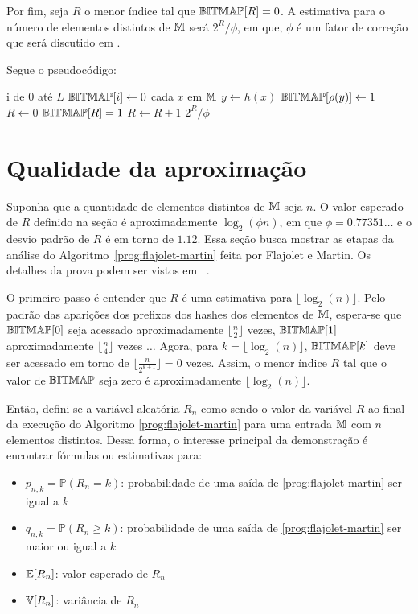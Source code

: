 Por fim, seja $R$ o menor índice tal que $\mathbb{BITMAP}[R] = 0$. A estimativa para o número de elementos distintos de 
$\mathbb{M}$ será $2^R/\phi$, em que, $\phi$ é um fator de correção que será discutido em 
.

Segue o pseudocódigo:
\begin{codebox}
  \li \For i de $0$ até $L$
      \Do
  \li    $\mathbb{BITMAP}[i] \gets 0$
      \End
  \li \For cada $x$ em $\mathbb{M}$
      \Do
  \li   $y \gets h(x)$
  \li   $\mathbb{BITMAP}[\rho(y)] \gets 1$
      \End
  \li $R \gets 0$
  \li \While $\mathbb{BITMAP}[R] = 1$
      \Do
  \li   $R \gets R + 1$
      \End
  \li
  \Return $2^R/\phi$
  \End
\end{codebox}

\newpage
\section{Qualidade da aproximação}
\label{sec:flajolet-martin:analysis}

Suponha que a quantidade de elementos distintos de $\mathbb{M}$ seja $n$. O valor esperado de $R$ definido na seção 
 é aproximadamente $\log_2(\phi n)$, em que $\phi = 0.77351\dots$ e o desvio padrão 
de $R$ é em torno de $1.12$. Essa seção busca mostrar as etapas da análise do Algoritmo~\ref{prog:flajolet-martin} feita 
por Flajolet e Martin. Os detalhes da prova podem ser vistos em ~\citep{flajolet:martin:85}.

O primeiro passo é entender que $R$ é uma estimativa para $\lfloor \log_2(n) \rfloor$. Pelo padrão das aparições dos 
prefixos dos hashes dos elementos de $\mathbb{M}$, espera-se que $\mathbb{BITMAP}[0]$ seja acessado aproximadamente $\lfloor 
\frac{n}{2} \rfloor$ vezes, $\mathbb{BITMAP}[1]$ aproximadamente $\lfloor \frac{n}{4} \rfloor$ vezes $\dots$ Agora, para 
$k = \lfloor \log_2(n) \rfloor$, $\mathbb{BITMAP}[k]$ deve ser acessado em torno de $\lfloor \frac{n}{2^{k+1}} \rfloor = 0$ 
vezes. Assim, o menor índice $R$ tal que o valor de $\mathbb{BITMAP}$ seja zero é aproximadamente $\lfloor \log_2(n) \rfloor$.

Então, defini-se a variável aleatória $R_n$ como sendo o valor da variável $R$ ao final da execução do Algoritmo 
\ref{prog:flajolet-martin} para uma entrada $\mathbb{M}$ com $n$ elementos distintos. Dessa forma, o interesse principal 
da demonstração é encontrar fórmulas ou estimativas para:
\begin{itemize}
  \item $p_{n,k} = \mathbb{P}(R_n = k)$: probabilidade de uma saída de \ref{prog:flajolet-martin} ser igual a $k$
  \item $q_{n,k} = \mathbb{P}(R_n \geq k)$: probabilidade de uma saída de \ref{prog:flajolet-martin} 
  ser maior ou igual a $k$
  \item $\mathbb{E}[R_n]$: valor esperado de $R_n$
  \item $\mathbb{V}[R_n]$: variância de $R_n$
\end{itemize}

